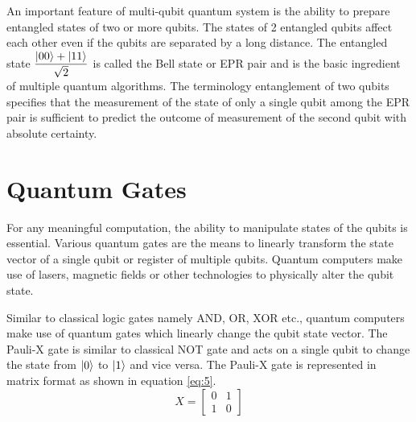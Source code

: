 \documentclass[english,a4paper,11pt,oneside,onecolumn]{book}
\begin{document}
\noindent An important feature of multi-qubit quantum system is the ability to prepare entangled states of two or more qubits. The states of 2 entangled qubits affect each other even if the qubits are separated by a long distance. The entangled state \(\dfrac{\ket{00} + \ket{11}}{\sqrt{2}}\) is called the Bell state or EPR pair and is the basic ingredient of multiple quantum algorithms. The terminology entanglement of two qubits specifies that the measurement of the state of only a single qubit among the EPR pair is sufficient to predict the outcome of measurement of the second qubit with absolute certainty.

\section{Quantum Gates}
\label{sec:qGates}
For any meaningful computation, the ability to manipulate states of the qubits is essential. Various quantum gates are the means to linearly transform the state vector of a single qubit or register of multiple qubits. Quantum computers make use of lasers, magnetic fields or other technologies to physically alter the qubit state.

\noindent Similar to classical logic gates namely AND, OR, XOR etc., quantum computers make use of quantum gates which linearly change the qubit state vector. The Pauli-X gate is similar to classical NOT gate and acts on a single qubit to change the state from \(\ket{0}\) to \(\ket{1}\) and vice versa. The Pauli-X gate is represented in matrix format as shown in equation \ref{eq:5}.
\begin{equation}\label{eq:5}
X = 
\begin{bmatrix}
0 & 1\\
1 & 0
\end{bmatrix}
\end{equation}
\end{document}
